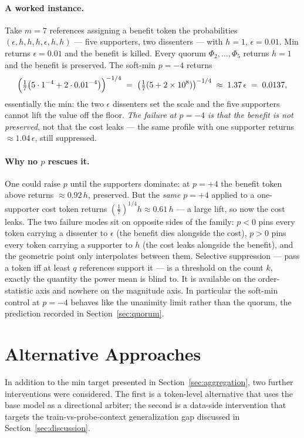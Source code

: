\documentclass[11pt]{article}
\begin{document}
\paragraph{A worked instance.} Take $m = 7$ references assigning a benefit token the probabilities $(\epsilon, h, h, h, \epsilon, h, h)$ --- five supporters, two dissenters --- with $h = 1$, $\epsilon = 0.01$. Min returns $\epsilon = 0.01$ and the benefit is killed. Every quorum $\Phi_2, \dots, \Phi_5$ returns $h = 1$ and the benefit is preserved. The soft-min $p = -4$ returns
\[
\Bigl(\tfrac17\bigl(5\cdot 1^{-4} + 2\cdot 0.01^{-4}\bigr)\Bigr)^{-1/4} \;=\; \bigl(\tfrac17(5 + 2\times 10^{8})\bigr)^{-1/4} \;\approx\; 1.37\,\epsilon \;=\; 0.0137,
\]
essentially the min: the two $\epsilon$ dissenters set the scale and the five supporters cannot lift the value off the floor. \emph{The failure at $p = -4$ is that the benefit is not preserved}, not that the cost leaks --- the same profile with one supporter returns $\approx 1.04\,\epsilon$, still suppressed.

\paragraph{Why no $p$ rescues it.} One could raise $p$ until the supporters dominate: at $p = +4$ the benefit token above returns $\approx 0.92\,h$, preserved. But the \emph{same} $p = +4$ applied to a one-supporter cost token returns $(\tfrac17)^{1/4} h \approx 0.61\,h$ --- a large lift, so now the cost leaks. The two failure modes sit on opposite sides of the family: $p < 0$ pins every token carrying a dissenter to $\epsilon$ (the benefit dies alongside the cost), $p > 0$ pins every token carrying a supporter to $h$ (the cost leaks alongside the benefit), and the geometric point only interpolates between them. Selective suppression --- pass a token iff at least $q$ references support it --- is a threshold on the count $k$, exactly the quantity the power mean is blind to. It is available on the order-statistic axis and nowhere on the magnitude axis. In particular the soft-min control at $p = -4$ behaves like the unanimity limit rather than the quorum, the prediction recorded in Section~\ref{sec:quorum}.

\section{Alternative Approaches}
\label{app:alternatives}

In addition to the min target presented in Section~\ref{sec:aggregation}, two further interventions were considered. The first is a token-level alternative that uses the base model as a directional arbiter; the second is a data-side intervention that targets the train-vs-probe-context generalization gap discussed in Section~\ref{sec:discussion}.
\end{document}
